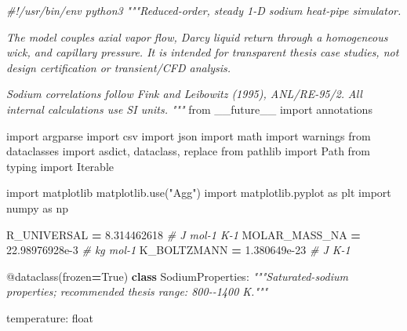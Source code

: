 \documentclass[
  12pt,a4paper,oneside]{report}
\newenvironment{Shaded}{\begin{snugshade}}{\end{snugshade}}
\newcommand{\AttributeTok}[1]{\textcolor[rgb]{0.77,0.63,0.00}{#1}}
\newcommand{\BuiltInTok}[1]{#1}
\newcommand{\CommentTok}[1]{\textcolor[rgb]{0.56,0.35,0.01}{\textit{#1}}}
\newcommand{\FloatTok}[1]{\textcolor[rgb]{0.00,0.00,0.81}{#1}}
\newcommand{\ImportTok}[1]{#1}
\newcommand{\KeywordTok}[1]{\textcolor[rgb]{0.13,0.29,0.53}{\textbf{#1}}}
\newcommand{\NormalTok}[1]{#1}
\newcommand{\OperatorTok}[1]{\textcolor[rgb]{0.81,0.36,0.00}{\textbf{#1}}}
\newcommand{\StringTok}[1]{\textcolor[rgb]{0.31,0.60,0.02}{#1}}
\newcommand{\VariableTok}[1]{\textcolor[rgb]{0.00,0.00,0.00}{#1}}
\begin{document}
\begin{Shaded}
\begin{Highlighting}[]
\CommentTok{\#!/usr/bin/env python3}
\CommentTok{"""Reduced{-}order, steady 1{-}D sodium heat{-}pipe simulator.}

\CommentTok{The model couples axial vapor flow, Darcy liquid return through a homogeneous}
\CommentTok{wick, and capillary pressure. It is intended for transparent thesis case}
\CommentTok{studies, not design certification or transient/CFD analysis.}

\CommentTok{Sodium correlations follow Fink and Leibowitz (1995), ANL/RE{-}95/2.}
\CommentTok{All internal calculations use SI units.}
\CommentTok{"""}
\ImportTok{from}\NormalTok{ \_\_future\_\_ }\ImportTok{import}\NormalTok{ annotations}

\ImportTok{import}\NormalTok{ argparse}
\ImportTok{import}\NormalTok{ csv}
\ImportTok{import}\NormalTok{ json}
\ImportTok{import}\NormalTok{ math}
\ImportTok{import}\NormalTok{ warnings}
\ImportTok{from}\NormalTok{ dataclasses }\ImportTok{import}\NormalTok{ asdict, dataclass, replace}
\ImportTok{from}\NormalTok{ pathlib }\ImportTok{import}\NormalTok{ Path}
\ImportTok{from}\NormalTok{ typing }\ImportTok{import}\NormalTok{ Iterable}

\ImportTok{import}\NormalTok{ matplotlib}
\NormalTok{matplotlib.use(}\StringTok{"Agg"}\NormalTok{)}
\ImportTok{import}\NormalTok{ matplotlib.pyplot }\ImportTok{as}\NormalTok{ plt}
\ImportTok{import}\NormalTok{ numpy }\ImportTok{as}\NormalTok{ np}

\NormalTok{R\_UNIVERSAL }\OperatorTok{=} \FloatTok{8.314462618}  \CommentTok{\# J mol{-}1 K{-}1}
\NormalTok{MOLAR\_MASS\_NA }\OperatorTok{=} \FloatTok{22.98976928e{-}3}  \CommentTok{\# kg mol{-}1}
\NormalTok{K\_BOLTZMANN }\OperatorTok{=} \FloatTok{1.380649e{-}23}  \CommentTok{\# J K{-}1}


\AttributeTok{@dataclass}\NormalTok{(frozen}\OperatorTok{=}\VariableTok{True}\NormalTok{)}
\KeywordTok{class}\NormalTok{ SodiumProperties:}
    \CommentTok{"""Saturated{-}sodium properties; recommended thesis range: 800{-}{-}1400 K."""}

\NormalTok{    temperature: }\BuiltInTok{float}


\end{Highlighting}
\end{Shaded}
\end{document}
